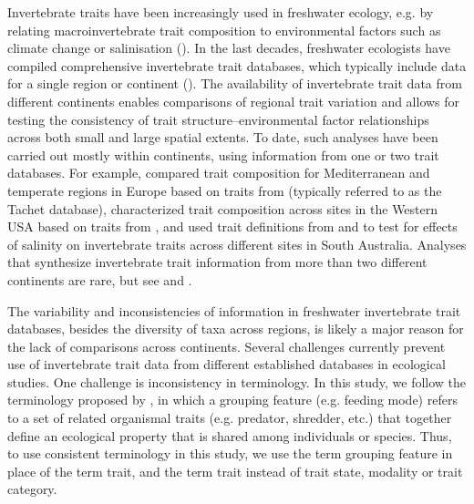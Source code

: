 \documentclass[12pt]{article}
\begin{document}
Invertebrate traits have been increasingly used in freshwater ecology, e.g. by relating macroinvertebrate trait composition to environmental factors such as climate change or salinisation (\cite{bhowmik_large_2015, poff_developing_2010, szocs_effects_2014}). In the last decades, freshwater ecologists have compiled comprehensive invertebrate trait databases, which typically include data for a single region or continent (\cite{kefford_integrated_2020, Philips_and_Smith_NZ_DB_2018, schmidt-kloiber_www.freshwaterecology.info_2015, tomanova_trophic_2006, ussegliopolatera_biological_2000, vieira_database_nodate}). The availability of invertebrate trait data from different continents enables comparisons of regional trait variation and allows for testing the consistency of trait structure–environmental factor relationships across both small and large spatial extents. To date, such analyses have been carried out mostly within continents, using information from one or two trait databases. For example, \citet{bonada_taxonomic_2007} compared trait composition for Mediterranean and temperate regions in Europe based on traits from \citet{ussegliopolatera_biological_2000} (typically referred to as the Tachet database), \citet{poff_developing_2010} characterized trait composition across sites in the Western USA based on traits from \citet{poff_functional_2006}, and \citet{botwe_effects_2018} used trait definitions from \citet{poff_functional_2006} and \citet{schafer_trait_2011} to test for effects of salinity on invertebrate traits across different sites in South Australia. Analyses that synthesize invertebrate trait information from more than two different continents are rare, but see \citet{brown_functional_2018} and \citet{statzner_reproductive_1997}. 

The variability and inconsistencies of information in freshwater invertebrate trait databases, besides the diversity of taxa across regions, is likely a major reason for the lack of comparisons across continents. Several challenges currently prevent use of invertebrate trait data from different established databases in ecological studies. One challenge is inconsistency in terminology. In this study, we follow the terminology proposed by \citet{schmera_proposed_2015}, in which a grouping feature (e.g. feeding mode) refers to a set of related organismal traits (e.g. predator, shredder, etc.) that together define an ecological property that is shared among individuals or species. Thus, to use consistent terminology in this study, we use the term grouping feature in place of the term trait, and the term trait instead of trait state, modality or trait category. 
\end{document}
